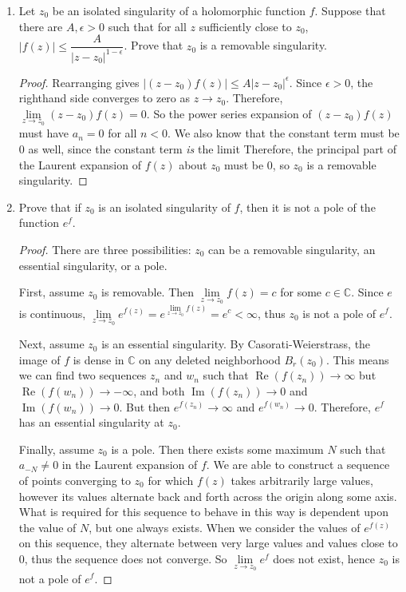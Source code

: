 \documentclass[10pt]{article}
\newcommand{\C}{\mathbb{C}}
\DeclareMathOperator*{\re}{Re}
\DeclareMathOperator*{\im}{Im}
\begin{document}
\begin{enumerate}
\item Let $z_0$ be an isolated singularity of a holomorphic function $f$.  Suppose that there are $A, \epsilon > 0$ such that for all $z$ sufficiently close to $z_0$, $|f(z)| \leq \dfrac{A}{|z-z_0|^{1-\epsilon}}$.  Prove that $z_0$ is a removable singularity.

\begin{proof}
Rearranging gives $|(z-z_0)f(z)| \leq A |z-z_0|^\epsilon$.  Since $\epsilon > 0$, the righthand side converges to zero as $z \rightarrow z_0$.  Therefore, $\lim\limits_{z \rightarrow z_0} (z-z_0) f(z) = 0$.  So the power series expansion of $(z-z_0)f(z)$ must have $a_n = 0$ for all $n <0$.  We also know that the constant term must be $0$ as well, since the constant term \emph{is} the limit Therefore, the principal part of the Laurent expansion of $f(z)$ about $z_0$ must be $0$, so $z_0$ is a removable singularity.
\end{proof}

\item Prove that if $z_0$ is an isolated singularity of $f$, then it is not a pole of the function $e^f$.

\begin{proof}
There are three possibilities: $z_0$ can be a removable singularity, an essential singularity, or a pole.

First, assume $z_0$ is removable.  Then $\lim\limits_{z \rightarrow z_0} f(z) = c$ for some $c \in \C$.  Since $e$ is continuous, $\lim\limits_{z \rightarrow z_0} e^{f(z)} = e^{\lim\limits_{z \rightarrow z_0} f(z)} = e^c < \infty$, thus $z_0$ is not a pole of $e^f$.

Next, assume $z_0$ is an essential singularity.  By Casorati-Weierstrass, the image of $f$ is dense in $\C$ on any deleted neighborhood $B_r(z_0)$.  This means we can find two sequences $z_n$ and $w_n$ such that $\re (f(z_n)) \rightarrow \infty$ but $\re (f(w_n)) \rightarrow - \infty$, and both $\im(f(z_n)) \rightarrow 0$ and $\im(f(w_n)) \rightarrow 0$.  But then $e^{f(z_n)} \rightarrow \infty$ and $e^{f(w_n)} \rightarrow 0$.  Therefore, $e^f$ has an essential singularity at $z_0$.

Finally, assume $z_0$ is a pole.  Then there exists some maximum $N$ such that $a_{-N} \neq 0$ in the Laurent expansion of $f$.  We are able to construct a sequence of points converging to $z_0$ for which $f(z)$ takes arbitrarily large values, however its values alternate back and forth across the origin along some axis.  What is required for this sequence to behave in this way is dependent upon the value of $N$, but one always exists.  When we consider the values of $e^{f(z)}$ on this sequence, they alternate between very large values and values close to 0, thus the sequence does not converge.  So $\lim\limits_{z \rightarrow z_0} e^f$ does not exist, hence $z_0$ is not a pole of $e^f$.
\end{proof}


\end{enumerate}
\end{document}
